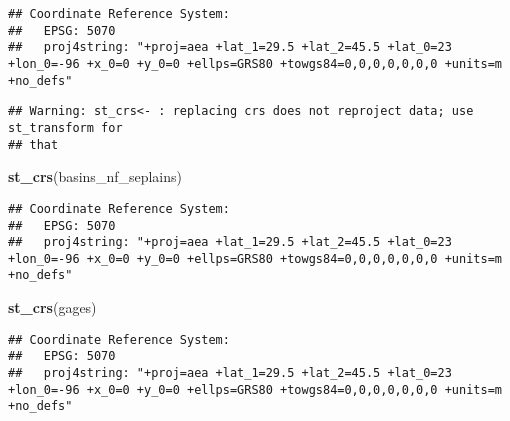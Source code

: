 \documentclass[]{article}
\newenvironment{Shaded}{\begin{snugshade}}{\end{snugshade}}
\newcommand{\KeywordTok}[1]{\textcolor[rgb]{0.13,0.29,0.53}{\textbf{#1}}}
\newcommand{\DataTypeTok}[1]{\textcolor[rgb]{0.13,0.29,0.53}{#1}}
\newcommand{\DecValTok}[1]{\textcolor[rgb]{0.00,0.00,0.81}{#1}}
\newcommand{\StringTok}[1]{\textcolor[rgb]{0.31,0.60,0.02}{#1}}
\newcommand{\OperatorTok}[1]{\textcolor[rgb]{0.81,0.36,0.00}{\textbf{#1}}}
\newcommand{\NormalTok}[1]{#1}
\begin{document}
\begin{verbatim}
## Coordinate Reference System:
##   EPSG: 5070 
##   proj4string: "+proj=aea +lat_1=29.5 +lat_2=45.5 +lat_0=23 +lon_0=-96 +x_0=0 +y_0=0 +ellps=GRS80 +towgs84=0,0,0,0,0,0,0 +units=m +no_defs"
\end{verbatim}

\begin{Shaded}
\end{Shaded}

\begin{verbatim}
## Warning: st_crs<- : replacing crs does not reproject data; use st_transform for
## that
\end{verbatim}

\begin{Shaded}
\begin{Highlighting}[]
\KeywordTok{st_crs}\NormalTok{(basins_nf_seplains)}
\end{Highlighting}
\end{Shaded}

\begin{verbatim}
## Coordinate Reference System:
##   EPSG: 5070 
##   proj4string: "+proj=aea +lat_1=29.5 +lat_2=45.5 +lat_0=23 +lon_0=-96 +x_0=0 +y_0=0 +ellps=GRS80 +towgs84=0,0,0,0,0,0,0 +units=m +no_defs"
\end{verbatim}

\begin{Shaded}
\begin{Highlighting}[]
\KeywordTok{st_crs}\NormalTok{(gages)}
\end{Highlighting}
\end{Shaded}

\begin{verbatim}
## Coordinate Reference System:
##   EPSG: 5070 
##   proj4string: "+proj=aea +lat_1=29.5 +lat_2=45.5 +lat_0=23 +lon_0=-96 +x_0=0 +y_0=0 +ellps=GRS80 +towgs84=0,0,0,0,0,0,0 +units=m +no_defs"
\end{verbatim}
\end{document}
